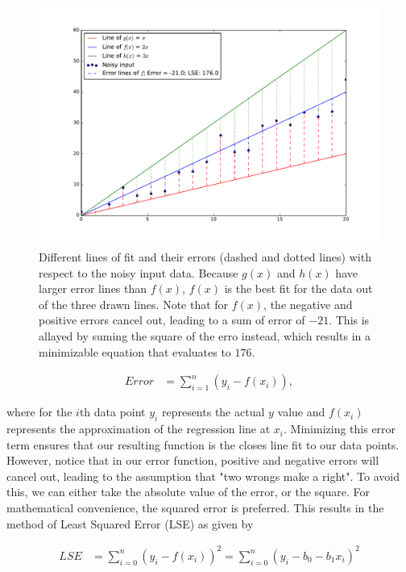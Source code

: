\begin{figure}[!h]
  \centering
  \includegraphics[width=\linewidth]{figures/error_lines.pdf}
  \caption{Different lines of fit and their errors (dashed and dotted lines) with respect to the noisy input data. Because $g(x)$ and $h(x)$ have larger error lines than $f(x)$, $f(x)$ is the best fit for the data out of the three drawn lines. Note that for $f(x)$, the negative and positive errors cancel out, leading to a sum of error of $-21$. This is allayed by suming the square of the erro instead, which results in a minimizable equation that evaluates to $176$.}
  \label{fig:error_lines}
\end{figure}

\begin{align*}
  Error &= \sum_{i=1}^n (y_i-f(x_i)),
\end{align*}

where for the $i$th data point $y_i$ represents the actual $y$ value and $f(x_i)$ represents the approximation of the regression line at $x_i$. Minimizing this error term ensures that our resulting function is the closes line fit to our data points. However, notice that in our error function, positive and negative errors will cancel out, leading to the assumption that "two wrongs make a right". To avoid this, we can either take the absolute value of the error, or the square. For mathematical convenience, the squared error is preferred. This results in the method of Least Squared Error (LSE) as given by

\begin{align}
\label{eq:least_square}
LSE &= \sum_{i=0}^n (y_i-f(x_i))^2  = \sum_{i=0}^n (y_i- b_0 - b_1x_i)^2
\end{align}


